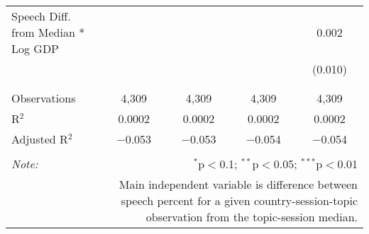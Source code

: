 \begin{table}[!htbp]
\begin{tabular}{@{\extracolsep{5pt}}lcccc}
 Speech Diff. from Median * Log GDP &  &  &  & 0.002 \\ 
  &  &  &  & (0.010) \\ 
  & & & & \\ 
\hline \\[-1.8ex] 
Observations & 4,309 & 4,309 & 4,309 & 4,309 \\ 
R$^{2}$ & 0.0002 & 0.0002 & 0.0002 & 0.0002 \\ 
Adjusted R$^{2}$ & $-$0.053 & $-$0.053 & $-$0.054 & $-$0.054 \\ 
\hline 
\hline \\[-1.8ex] 
\textit{Note:}  & \multicolumn{4}{r}{$^{*}$p$<$0.1; $^{**}$p$<$0.05; $^{***}$p$<$0.01} \\ 
 & \multicolumn{4}{r}{Main independent variable is difference between speech percent for a given country-session-topic observation from the topic-session median.} \\ 
\end{tabular} 
\end{table} 
